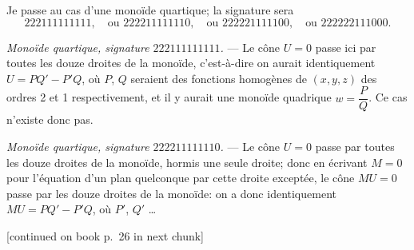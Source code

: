 \documentclass[11pt,a4paper]{article}
\begin{document}
Je passe au cas d'une mono\"{i}de quartique; la signature sera
\[
222111111111, \quad \text{ou } 222211111110, \quad \text{ou } 222221111100, \quad \text{ou } 222222111000.
\]

\medskip
\noindent\textit{Mono\"{i}de quartique, signature $222111111111$.} --- Le c\^{o}ne $U = 0$ passe ici par toutes les douze droites de la mono\"{i}de, c'est-\`{a}-dire on aurait identiquement $U = PQ' - P'Q$, o\`{u} $P$, $Q$ seraient des fonctions homog\`{e}nes de $(x, y, z)$ des ordres 2 et 1 respectivement, et il y aurait une mono\"{i}de quadrique $w = \dfrac{P}{Q}$. Ce cas n'existe donc pas.

\medskip
\noindent\textit{Mono\"{i}de quartique, signature $222211111110$.} --- Le c\^{o}ne $U = 0$ passe par toutes les douze droites de la mono\"{i}de, hormis une seule droite; donc en \'{e}crivant $M = 0$ pour l'\'{e}quation d'un plan quelconque par cette droite except\'{e}e, le c\^{o}ne $MU = 0$ passe par les douze droites de la mono\"{i}de: on a donc identiquement $MU = PQ' - P'Q$, o\`{u} $P'$, $Q'$ \ldots

\bigskip
\begin{flushright}\small[continued on book p.~26 in next chunk]\end{flushright}
\end{document}
